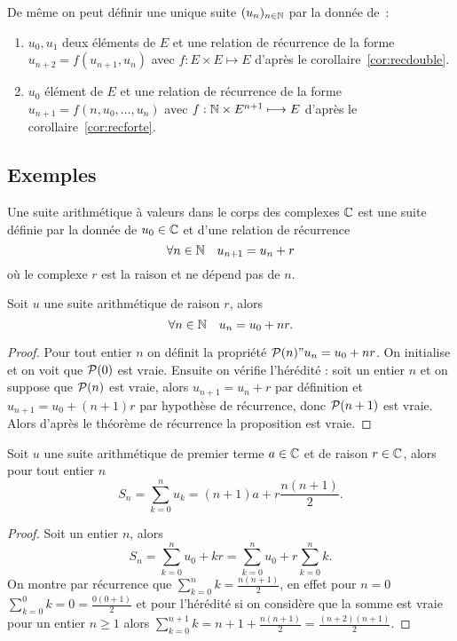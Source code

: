 De même on peut définir une unique suite $(u_n)_{n\in\N}$ par la donnée de~:
\begin{enumerate}
\item $u_0, u_1$ deux éléments de $E$ et une relation de récurrence de la forme $u_{n+2}=f(u_{n+1},u_{n})$ avec $f:E\times E\longmapsto E$ d'après le corollaire~\ref{cor:recdouble}.
\item $u_0$ élément de $E$ et une relation de récurrence de la forme $u_{n+1}=f(n,u_{0},\ldots,u_{n})$ avec $f:\N\times E^{n+1}\longmapsto E$ d'après le corollaire~\ref{cor:recforte}.
\end{enumerate}

\subsection{Exemples}
\begin{defdef}
  Une suite arithmétique à valeurs dans le corps des complexes $\C$ est une suite définie par la donnée de $u_0\in\C$ et d'une relation de récurrence 
  \begin{equation}
    \forall n \in \N \quad u_{n+1}=u_n+r
  \end{equation}
  où le complexe $r$ est la raison et ne dépend pas de $n$.
\end{defdef}
\begin{prop}
  Soit $u$ une suite arithmétique de raison $r$, alors
  \begin{equation}
    \forall n \in \N \quad u_n=u_0+nr.
  \end{equation}
\end{prop}
\begin{proof}
  Pour tout entier $n$ on définit la propriété $\P(n) "u_n=u_0+nr$. On initialise et on voit que $\P(0)$ est vraie. Ensuite on vérifie l'hérédité : soit un entier $n$ et on suppose que $\P(n)$ est vraie, alors $u_{n+1}=u_n+r$ par définition et $u_{n+1}=u_0+(n+1)r$ par hypothèse de récurrence, donc $\P(n+1)$ est vraie. Alors d'après  le théorème de récurrence la proposition est vraie.
\end{proof}
\begin{prop}
  Soit $u$ une suite arithmétique de premier terme $a\in\C$ et de raison $r\in\C$, alors pour tout entier $n$
  \begin{equation}
    S_n=\sum_{k=0}^n u_k=(n+1)a+r\frac{n(n+1)}{2}.
  \end{equation}
\end{prop}
\begin{proof}
  Soit un entier $n$, alors
  \begin{equation}
    S_n=\sum_{k=0}^n u_0+kr= \sum_{k=0}^n u_0 + r\sum_{k=0}^n k.
  \end{equation}
  On montre par récurrence que $\sum_{k=0}^n k=\frac{n(n+1)}{2}$, en effet pour $n=0$ $\sum_{k=0}^0 k=0=\frac{0(0+1)}{2}$ et pour l'hérédité si on considère que la somme est vraie pour un entier $n \geq 1$ alors $\sum_{k=0}^{n+1} k= n+1+\frac{n(n+1)}{2}=\frac{(n+2)(n+1)}{2}$.
\end{proof}

